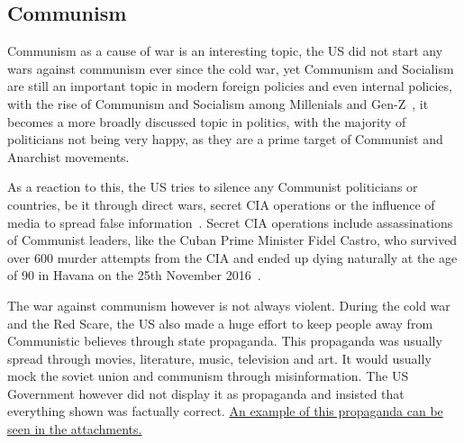 \subsection{Communism}
Communism as a cause of war is an interesting topic, the US did not start any wars against communism ever since the cold war, yet Communism and Socialism are still an important topic in modern foreign policies and even internal policies, with the rise of Communism and Socialism among Millenials and Gen-Z~\autocite{theguardian-genz-capitalism}, it becomes a more broadly discussed topic in politics, with the majority of politicians not being very happy, as they are a prime target of Communist and Anarchist movements.

As a reaction to this, the US tries to silence any Communist politicians or countries, be it through direct wars, secret CIA operations or the influence of media to spread false information~\autocite{theguardian-anti-communist-usa}. Secret CIA operations include assassinations of Communist leaders, like the Cuban Prime Minister Fidel Castro, who survived over 600 murder attempts from the CIA and ended up dying naturally at the age of 90 in Havana on the 25th November 2016~\autocite{cnn-fidel-castro-assassination}. %

The war against communism however is not always violent. During the cold war and the Red Scare, the US also made a huge effort to keep people away from Communistic believes through state propaganda.
This propaganda was usually spread through movies, literature, music, television and art. It would usually mock the soviet union and communism through misinformation. The US Government however did not display it as propaganda and insisted that everything shown was factually correct.
\hyperlink{section.4}{An example of this propaganda can be seen in the attachments.}